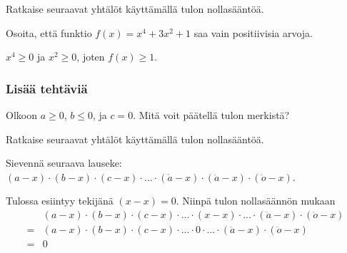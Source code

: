 \begin{tehtavasivu}
\begin{tehtava}
    Ratkaise seuraavat yhtälöt käyttämällä tulon nollasääntöä.
    \begin{vastaus}
    \end{vastaus}
\end{tehtava}

\begin{tehtava} 
Osoita, että funktio $f(x)=x^4+3x^2+1$ saa vain positiivisia arvoja.
    \begin{vastaus}
     $x^4\geq 0$ ja $x^2 \geq 0$, joten $f(x) \geq 1$.
    \end{vastaus}
\end{tehtava}

\subsubsection*{Lisää tehtäviä}

\begin{tehtava}
	Olkoon $a \geq 0$, $b \leq 0$, ja $c=0$. Mitä voit päätellä tulon merkistä?
	
	\begin{vastaus}
	\end{vastaus}
\end{tehtava}

\begin{tehtava}
    Ratkaise seuraavat yhtälöt käyttämällä tulon nollasääntöä.
    \begin{vastaus}
    \end{vastaus}
\end{tehtava}

\begin{tehtava}
    Sievennä seuraava lauseke: $(a-x)\cdot(b-x)\cdot(c-x)\cdot...\cdot(\mathring{a}-x)\cdot(\ddot{a}-x)\cdot(\ddot{o}-x)$.
    \begin{vastaus}
        Tulossa esiintyy tekijänä $(x-x)=0$. Niinpä tulon nollasäännön mukaan
        \begin{align*}
            &(a-x)\cdot(b-x)\cdot(c-x)\cdot...\cdot(x-x)\cdot...\cdot(\ddot{a}-x)\cdot(\ddot{o}-x) \\
            =&(a-x)\cdot(b-x)\cdot(c-x)\cdot...\cdot 0\cdot...\cdot(\ddot{a}-x)\cdot(\ddot{o}-x) \\
            =&0
        \end{align*}
    \end{vastaus}
\end{tehtava}


\end{tehtavasivu}
